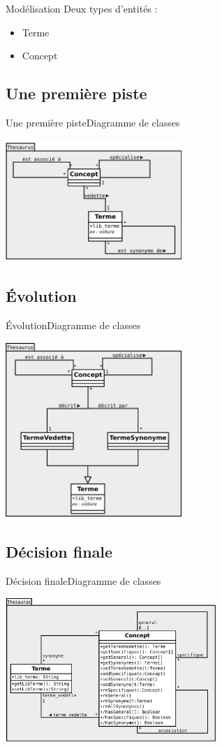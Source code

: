 \begin{frame}{Modélisation}
	Deux types d'entités :
	\begin{itemize}
	\item Terme
	\item Concept
	\end{itemize}
\end{frame}

\subsection{Une première piste}
\begin{frame}{Une première piste}{Diagramme de classes}
\begin{center}
\includegraphics[width=0.5\textwidth]{files/class_v1}
\end{center}
\end{frame}

\subsection{Évolution}
\begin{frame}{Évolution}{Diagramme de classes}
\begin{center}
\includegraphics[width=0.5\textwidth]{files/class_v2}
\end{center}
\end{frame}

\subsection{Décision finale}
\begin{frame}{Décision finale}{Diagramme de classes}
\begin{center}
\includegraphics[width=0.6\textwidth]{files/class_v3}
\end{center}
\end{frame}
